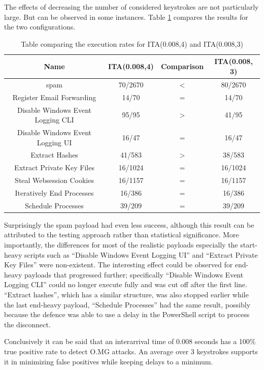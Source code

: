 The effects of decreasing the number of considered keystrokes are not particularly large. But can be observed in some instances. Table \ref{table:ITA_vs_ITA} compares the results for the two configurations. 

\begin{table}[h]
\centering
\begin{tabular}{|c|c|c|c|}
\hline
Name & ITA(0.008,4) & Comparison & ITA(0.008, 3) \\
\hline
spam & 70/2670 & < & 80/2670 \\
\hline
Register Email Forwarding & 14/70 & = &  14/70 \\
\hline
Disable Windows Event Logging CLI & 95/95 & > & 41/95 \\
\hline
Disable Windows Event Logging UI & 16/47 & = &  16/47 \\ 
\hline
Extract Hashes & 41/583 & > &  38/583 \\
\hline
Extract Private Key Files &  16/1024 & = &  16/1024 \\
\hline
Steal Websession Cookies &  16/1157 & = & 16/1157 \\
\hline
Iteratively End Processes & 16/386 & = & 16/386 \\
\hline
Schedule Processes & 39/209 & = & 39/209 \\
\hline
\end{tabular}
\caption{Table comparing the execution rates for ITA(0.008,4) and ITA(0.008,3)}
\label{table:ITA_vs_ITA}
\end{table}


Surprisingly the spam payload had even less success, although this result can be attributed to the testing approach rather than statistical significance. More importantly, the differences for most of the realistic payloads especially the start-heavy scripts such as ``Disable Windows Event Logging UI'' and ``Extract Private Key Files'' were non-existent. The interesting effect could be observed for end-heavy payloads that progressed further; specifically ``Disable Windows Event Logging CLI'' could no longer execute fully and was cut off after the first line. ``Extract hashes'', which has a similar structure, was also stopped earlier while the last end-heavy payload, ``Schedule Processes'' had the same result, possibly because the defence was able to use a delay in the PowerShell script to process the disconnect.  


Conclusively it can be said that an interarrival time of 0.008 seconds has a 100\% true positive rate to detect O.MG attacks. An average over 3 keystrokes supports it in minimizing false positives while keeping delays to a minimum.



